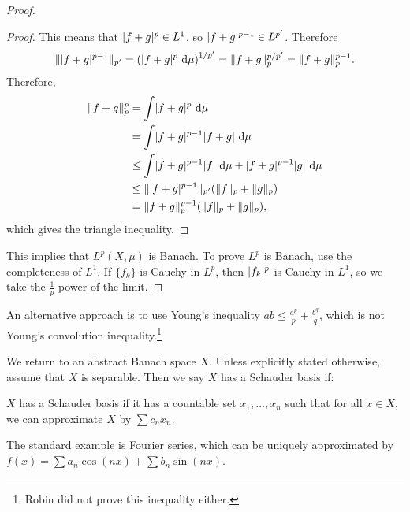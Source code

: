\documentclass[10pt, twoside]{article}
\renewcommand{\d}{\ \mathrm{d}}
\begin{document}
\begin{thm}
\begin{proof}
\begin{mdframed}[style=default]
\begin{proof}
                    This means that $\lvert f+g\rvert^p \in L^1$, so $\lvert f+g\rvert^{p-1}
                    \in L^{p'}$. Therefore \[\norm{\abs{f+g}^{p-1}}_{p'}
                        =\left( \abs{f+g}^p \d \mu \right)^{1/p'} =
                        \norm{f+g}_p^{p/p'} = \norm{f+g}_p^{p-1}.\] Therefore,
                        \begin{align*} \norm{f+g}_p^p &= \int \abs{f+g}^p \d
                            \mu \\ &= \int \abs{f+g}^{p-1}\abs{f+g} \d \mu \\
                                   &\leq \int \abs{f+g}^{p-1}\abs{f} \d \mu +
                            \abs{f+g}^{p-1}\abs{g} \d \mu \\ &\leq
                            \norm{\abs{f+g}^{p-1}}_{p'}(\norm{f}_p +
                            \norm{g}_p) \\ &= \norm{f+g}_p^{p-1}(\norm{f}_p +
                        \norm{g}_p), \end{align*} which gives the triangle
                    inequality.  \end{proof} \end{mdframed} This implies that
                    $L^p(X,\mu)$ is Banach. To prove $L^p$ is Banach, use the
                    completeness of $L^1$. If $\{f_k\}$ is Cauchy in $L^p$,
                    then $\lvert f_k\rvert^p$ is Cauchy in $L^1$, so we take the
                    $\frac{1}{p}$ power of the limit.  \end{proof} \end{thm}

    An alternative approach is to use Young's inequality $ab \leq \frac{a^p}{p}
    + \frac{b^q}{q}$, which is not Young's convolution
    inequality.\footnote{Robin did not prove this inequality either.}

    We return to an abstract Banach space $X$. Unless explicitly stated
    otherwise, assume that $X$ is separable. Then we say $X$ has a Schauder
    basis if:

    \begin{defn} $X$ has a Schauder basis if it has a countable
    set $x_1, \ldots, x_n$ such that for all $x \in X$, we can approximate $X$
by $\sum c_nx_n$.  \end{defn}

    \begin{exm} The standard example is Fourier series, which can be uniquely
    approximated by $f(x) = \sum a_n \cos(nx) + \sum b_n \sin(nx)$.  \end{exm}
\end{document}
